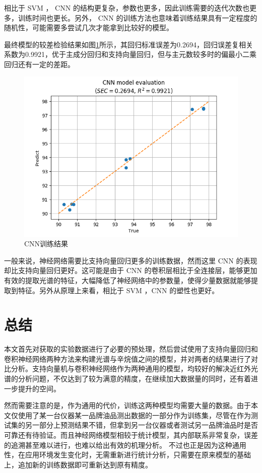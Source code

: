 \documentclass[a4paper]{article}
\begin{document}
			相比于 SVM ， CNN 的结构更复杂，参数也更多，因此训练需要的迭代次数也更多，训练时间也更长。另外， CNN 的训练方法也意味着训练结果具有一定程度的随机性，可能需要多尝试几次才能拿到比较好的模型。
			
			最终模型的较差检验结果如图\ref{fig:cnnresult}所示，其回归标准误差为0.2694，回归误差复相关系数为0.9921，优于主成分回归和支持向量回归，但与主元数较多时的偏最小二乘回归还有一定的差距。
			
			\begin{figure}
				\centering
				\includegraphics[width=\linewidth]{../img/cnn_result}
				\caption{CNN训练结果}
				\label{fig:cnnresult}
			\end{figure}
			
			一般来说，神经网络需要比支持向量回归更多的训练数据，然而这里 CNN 的表现却比支持向量回归更好。这可能是由于 CNN 的卷积层相比于全连接层，能够更加有效的提取光谱的特征，大幅降低了神经网络中的参数量，使得少量数据就能够提取到特征。另外从原理上来看，相比于 SVM ，CNN 的塑性也更好。
			
	\section{总结}
		本文首先对获取的实验数据进行了必要的预处理，然后尝试使用了支持向量回归和卷积神经网络两种方法来构建光谱与辛烷值之间的模型，并对两者的结果进行了对比分析。支持向量机与卷积神经网络作为两种通用的模型，均较好的解决近红外光谱的分析问题，不仅达到了较为满意的精度，在继续加大数据量的同时，还有着进一步提升的空间。
		
		然而需要注意的是，作为通用的代价，训练这两种模型均需要大量的数据。由于本文仅使用了某一台仪器某一品牌油品测出数据的一部分作为训练集，尽管在作为测试集的另一部分上预测结果不错，但拿到另一台仪器或者测试另一品牌油品时是否可靠还有待验证。而且神经网络模型相较于统计模型，其内部联系非常复杂，误差的追溯甚至难以进行，也难以给出有效的机理分析。
		不过也正是因为这种通用性，在应用环境发生变化时，无需重新进行统计分析，只需要在原来模型的基础上，追加新的训练数据即可重新达到原有精度。
		
\end{document}

